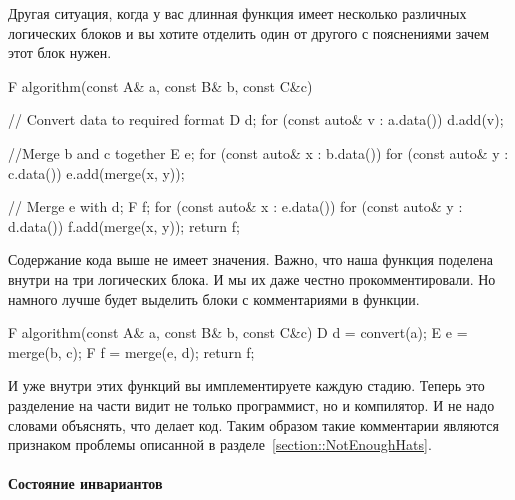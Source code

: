 Другая ситуация, когда у вас длинная функция имеет несколько различных логических блоков и вы хотите отделить один от другого с пояснениями зачем этот блок нужен.
\begin{cppcode}
F algorithm(const A& a, const B& b, const C&c) {
  // Convert data to required format
  D d;
  for (const auto& v : a.data()) {
    d.add(v);
  }
  
  //Merge b and c together
  E e;
  for (const auto& x : b.data()) {
    for (const auto& y : c.data()) {
      e.add(merge(x, y));
    }
  }
  
  // Merge e with d;
  F f;
  for (const auto& x : e.data()) {
    for (const auto& y : d.data()) {
      f.add(merge(x, y));
    }
  }
  return f;
}
\end{cppcode}
Содержание кода выше не имеет значения.
Важно, что наша функция поделена внутри на три логических блока.
И мы их даже честно прокомментировали.
Но намного лучше будет выделить блоки с комментариями в функции.
\begin{cppcode}
F algorithm(const A& a, const B& b, const C&c) {
  D d = convert(a);
  E e = merge(b, c);
  F f = merge(e, d);
  return f;
}
\end{cppcode}
И уже внутри этих функций вы имплементируете каждую стадию.
Теперь это разделение на части видит не только программист, но и компилятор.
И не надо словами объяснять, что делает код.
Таким образом такие комментарии являются признаком проблемы описанной в разделе~\ref{section::NotEnoughHats}.

\paragraph{Состояние инвариантов}

